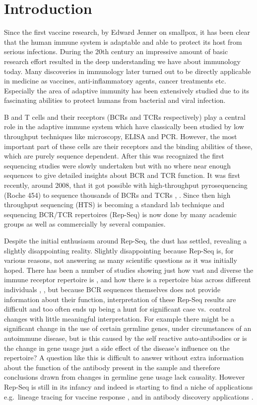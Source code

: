 \chapter{Introduction}
Since the first vaccine research, by Edward Jenner on smallpox, it has been clear that the human immune system is adaptable and able to protect its host from serious infections.
During the 20th century an impressive amount of basic research effort resulted in the deep understanding we have about immunology today.
Many discoveries in immunology later turned out to be directly applicable in medicine as vaccines, anti-inflammatory agents, cancer treatments etc.
Especially the area of adaptive immunity has been extensively studied due to its fascinating abilities to protect humans from bacterial and viral infection.

B and T cells and their receptors (BCRs and TCRs respectively) play a central role in the adaptive immune system which have classically been studied by low throughput techniques like microscopy, ELISA and PCR.
However, the most important part of these cells are their receptors and the binding abilities of these, which are purely sequence dependent.
After this was recognized the first sequencing studies were slowly undertaken but with no where near enough sequences to give detailed insights about BCR and TCR function.
It was first recently, around 2008, that it got possible with high-throughput pyrosequencing (Roche 454) to sequence thousands of BCRs and TCRs \cite{campbell2008subclonal}, \cite{boyd2008high}.
Since then high throughput sequencing (HTS) is becoming a standard lab technique and sequencing BCR/TCR repertoires (Rep-Seq) is now done by many academic groups as well as commercially by several companies.

Despite the initial enthusiasm around Rep-Seq, the dust has settled, revealing a slightly disappointing reality.
Slightly disappointing because Rep-Seq is, for various reasons, not answering as many scientific questions as it was initially hoped.
There has been a number of studies showing just how vast and diverse the immune receptor repertoire is \cite{zhang20173d}, \cite{elhanati2015inferring} and how there is a repertoire bias across different individuals \cite{dewitt2016public}, \cite{vander2017dysregulation}, but because BCR sequences themselves does not provide information about their function, interpretation of these Rep-Seq results are difficult and too often ends up being a hunt for significant case vs.\ control changes with little meaningful interpretation.
For example there might be a significant change in the use of certain germline genes, under circumstances of an autoimmune disease, but is this caused by the self reactive auto-antibodies or is the change in gene usage just a side effect of the disease's influence on the repertoire?
A question like this is difficult to answer without extra information about the function of the antibody present in the sample and therefore conclusions drawn from changes in germline gene usage lack causality.
However Rep-Seq is still in its infancy and indeed is starting to find a niche of applications e.g.\ lineage tracing for vaccine response \cite{Doria-Rose2014-vi}, \cite{Wu2011-yj} and in antibody discovery applications \cite{reddy2010monoclonal}.

